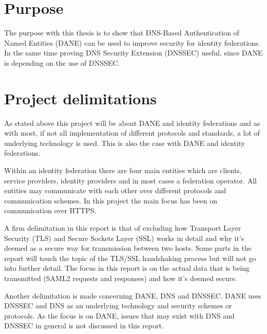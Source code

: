 \section{Purpose}
The purpose with this thesis is to show that DNS-Based Authentication of Named Entities (DANE) \cite{rfc:6394,rfc:draft-dane,rfc:draft-smime} can be used to improve security for identity federations.
In the same time proving DNS Security Extension (DNSSEC) \cite{rfc:4033,rfc:4034,rfc:4035,rfc:5011} useful, since DANE is 
depending on the use of DNSSEC.

\section{Project delimitations}
As stated above this project will be about DANE and identity federations and as with most, if not all implementation of different protocols and standards, a lot of underlying technology is used.
This is also the case with DANE and identity federations.

Within an identity federation there are four main entities which are clients, service providers, identity providers and in most cases a federation operator.
All entities may communicate with each other over different protocols and communication schemes.
In this project the main focus has been on communication over HTTPS.

A firm delimitation in this report is that of excluding how Transport Layer Security (TLS) and Secure Sockets Layer (SSL) works in detail and why it's deemed as a secure way for transmission between two hosts.
Some parts in the report will touch the topic of the TLS/SSL handshaking process but will not go into further detail.
The focus in this report is on the actual data that is being transmitted (SAML2 requests and responses) and how it's deemed secure. 

Another delimitation is made concerning DANE, DNS and DNSSEC.
DANE uses DNSSEC and DNS as an underlying technology and security schemes or protocols.
As the focus is on DANE, issues that may exist with DNS and DNSSEC in general is not discussed in this report.







